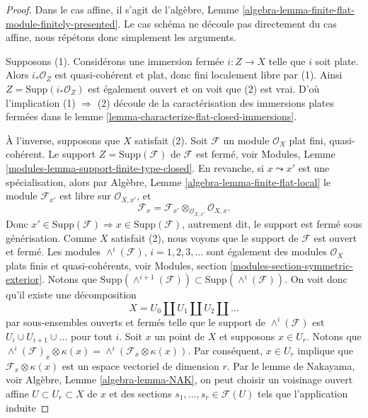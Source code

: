 \begin{proof}
Dans le cas affine, il
s'agit de l'algèbre, Lemme \ref{algebra-lemma-finite-flat-module-finitely-presented}. Le cas schéma ne découle
pas directement du cas affine, nous répétons donc simplement
les arguments.

\medskip\noindent
Supposons (1). Considérons une immersion fermée $i : Z \to X$ telle que
$i$ soit plate. Alors $i_*\mathcal{O}_Z$ est quasi-cohérent et plat,
donc fini localement libre par (1). Ainsi $Z = \text{Supp}(i_*\mathcal{O}_Z)$ est également
ouvert et on voit que (2) est vrai. D'où l'implication (1) $\Rightarrow$
(2) découle de la caractérisation des immersions
plates fermées dans le lemme \ref{lemma-characterize-flat-closed-immersions}.

\medskip\noindent
À l’inverse, supposons que $X$
satisfait (2). Soit $\mathcal{F}$ un module $\mathcal{O}_X$
plat fini, quasi-cohérent. Le support $Z = \text{Supp}(\mathcal{F})$ de $\mathcal{F}$
est fermé, voir Modules, Lemme \ref{modules-lemma-support-finite-type-closed}.
En revanche, si $x \leadsto x'$ est une spécialisation,
alors par Algèbre, Lemme \ref{algebra-lemma-finite-flat-local}
le module $\mathcal{F}_{x'}$ est libre sur $\mathcal{O}_{X, x'}$, et
$$
\mathcal{F}_x =
\mathcal{F}_{x'} \otimes_{\mathcal{O}_{X, x'}} \mathcal{O}_{X, x}.
$$
Donc
$x' \in \text{Supp}(\mathcal{F}) \Rightarrow x \in \text{Supp}(\mathcal{F})$, autrement dit, le support est fermé sous
générisation. Comme $X$ satisfait
(2), nous voyons que le support de $\mathcal{F}$
est ouvert et fermé. Les modules $\wedge^i(\mathcal{F})$, $i = 1, 2, 3, \ldots$
sont également des modules $\mathcal{O}_X$
plats
finis et quasi-cohérents, voir
Modules,
section \ref{modules-section-symmetric-exterior}. Notons que
$\text{Supp}(\wedge^{i + 1}(\mathcal{F})) \subset
\text{Supp}(\wedge^i(\mathcal{F}))$. On voit donc qu'il
existe une décomposition
$$
X = U_0 \amalg U_1 \amalg U_2 \amalg \ldots
$$
par sous-ensembles ouverts et fermés telle
que le support de $\wedge^i(\mathcal{F})$ est $U_i \cup U_{i + 1} \cup \ldots$ pour tout $i$.
Soit $x$ un point de $X$
et supposons $x \in U_r$. Notons que
$\wedge^i(\mathcal{F})_x \otimes \kappa(x) =
\wedge^i(\mathcal{F}_x \otimes \kappa(x))$. Par conséquent, $x \in U_r$
implique que $\mathcal{F}_x \otimes \kappa(x)$ est un espace vectoriel de dimension
$r$. Par le lemme de Nakayama, voir
Algèbre, Lemme \ref{algebra-lemma-NAK}, on peut choisir un voisinage ouvert affine $U \subset U_r \subset X$ de $x$
et des sections $s_1, \ldots, s_r \in \mathcal{F}(U)$ tels que l'application
induite

\end{proof}
